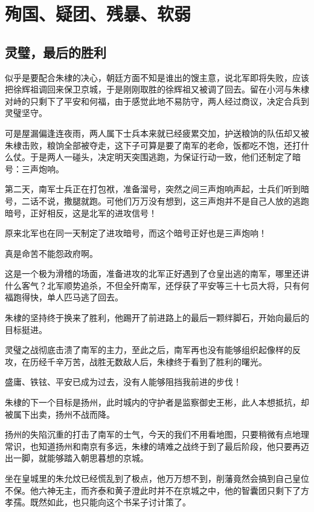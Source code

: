 \section{殉国、疑团、残暴、软弱}
\ifnum{}
	\begin{multicols}{\theparacolNo}
		\fi
		\subsection{灵璧，最后的胜利}
		似乎是要配合朱棣的决心，朝廷方面不知是谁出的馊主意，说北军即将失败，应该把徐辉祖调回来保卫京城，于是刚刚取胜的徐辉祖又被调了回去。留在小河与朱棣对峙的只剩下了平安和何福，由于感觉此地不易防守，两人经过商议，决定合兵到灵璧坚守。

		可是屋漏偏逢连夜雨，两人属下士兵本来就已经疲累交加，护送粮饷的队伍却又被朱棣击败，粮饷全部被夺走，这下子可算是要了南军的老命，饭都吃不饱，还打什么仗。于是两人一碰头，决定明天突围逃跑，为保证行动一致，他们还制定了暗号：三声炮响。

		第二天，南军士兵正在打包袱，准备溜号，突然之间三声炮响声起，士兵们听到暗号，二话不说，撒腿就跑。可他们万万没有想到，这三声炮并不是自己人放的逃跑暗号，正好相反，这是北军的进攻信号！

		原来北军也在同一天制定了进攻暗号，而这个暗号正好也是三声炮响！

		真是命苦不能怨政府啊。

		这是一个极为滑稽的场面，准备进攻的北军正好遇到了仓皇出逃的南军，哪里还讲什么客气？北军顺势追杀，不但全歼南军，还俘获了平安等三十七员大将，只有何福跑得快，单人匹马逃了回去。

		朱棣的坚持终于换来了胜利，他踢开了前进路上的最后一颗绊脚石，开始向最后的目标挺进。

		灵璧之战彻底击溃了南军的主力，至此之后，南军再也没有能够组织起像样的反攻，在历经千辛万苦，战胜无数敌人后，朱棣终于看到了胜利的曙光。

		盛庸、铁铉、平安已成为过去，没有人能够阻挡我前进的步伐！

		朱棣的下一个目标是扬州，此时城内的守护者是监察御史王彬，此人本想抵抗，却被属下出卖，扬州不战而降。

		扬州的失陷沉重的打击了南军的士气，今天的我们不用看地图，只要稍微有点地理常识，也知道扬州和南京有多远，朱棣的靖难之战终于到了最后阶段，他只要再迈出一脚，就能够踏入朝思暮想的京城。

		坐在皇城里的朱允炆已经慌乱到了极点，他万万想不到，削藩竟然会搞到自己皇位不保。他六神无主，而齐泰和黄子澄此时并不在京城之中，他的智囊团只剩下了方孝孺。既然如此，也只能向这个书呆子讨计策了。


\end{multicols}
